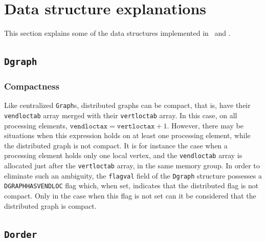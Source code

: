 
\section{Data structure explanations}
\label{sec-data}

This section explains some of the data structures implemented in
\scotch\ and \ptscotch.

\subsection{\texttt{Dgraph}}
\label{sec-data-dgraph}

\subsubsection{Compactness}

Like centralized \texttt{Graph}s, distributed graphs can be compact,
that is, have their \texttt{vend\lbt loc\lbt tab} array merged with
their \texttt{vert\lbt loc\lbt tab} array. In this case, on all
processing elements, $\mathtt{vendloctax} = \mathtt{vertloctax} + 1$.
However, there may be situations when this expression holds on at
least one processing element, while the distributed graph is not
compact. It is for instance the case when a processing element holds
only one local vertex, and the \texttt{vend\lbt loc\lbt tab} array is
allocated just after the \texttt{vert\lbt loc\lbt tab} array, in the
same memory group. In order to eliminate such an ambiguity, the
\texttt{flagval} field of the \texttt{Dgraph} structure possesses a
\texttt{DGRAPH\lbt HAS\lbt VEND\lbo LOC} flag which, when set,
indicates that the distributed flag is not compact. Only in the case
when this flag is not set can it be considered that the distributed
graph is compact.

\subsection{\texttt{Dorder}}
\label{sec-data-dorder}

